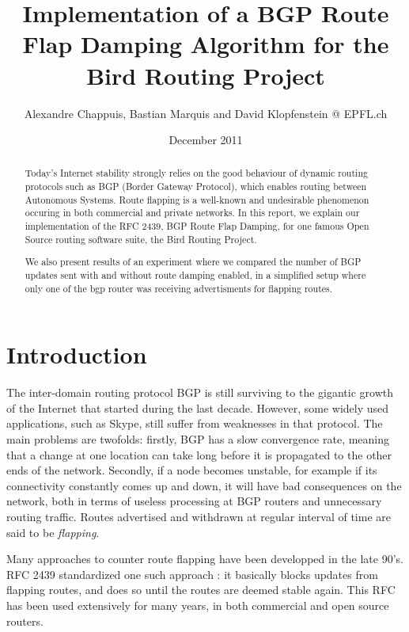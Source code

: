 \documentclass[a4paper,english]{IEEEtran}
\begin{document}
\date{December 2011}

\author{Alexandre Chappuis, Bastian Marquis and David Klopfenstein @ EPFL.ch}

\title{Implementation of a BGP Route Flap Damping Algorithm for the Bird
Routing Project}

\maketitle

\begin{abstract}
Today's Internet stability strongly relies on the good behaviour of
dynamic routing protocols such as BGP (Border Gateway Protocol), which
enables routing between Autonomous Systems. Route flapping is a well-known
and undesirable phenomenon occuring in both commercial and private
networks. In this report, we explain our implementation of the RFC
2439, BGP Route Flap Damping, for one famous Open Source routing software
suite, the Bird Routing Project.

We also present results of an experiment where we compared the number
of BGP updates sent with and without route damping enabled, in a simplified setup
where only one of the bgp router was receiving advertisments for flapping
routes.
\end{abstract}

\section{Introduction}

The inter-domain routing protocol BGP is still surviving to the gigantic
growth of the Internet that started during the last decade. However,
some widely used applications, such as Skype, still suffer from weaknesses
in that protocol. The main problems are twofolds: firstly, BGP has
a slow convergence rate, meaning that a change at one location can take
long before it is propagated to the other ends of the network.
Secondly, if a node becomes unstable, for example if its connectivity
constantly comes up and down, it will have bad consequences on the
network, both in terms of useless processing at BGP routers and unnecessary
routing traffic. Routes advertised and withdrawn at regular interval
of time are said to be \textit{flapping}.

Many approaches to counter route flapping have been developped in
the late 90's. RFC 2439\cite{rfc2439} standardized one such approach
: it basically blocks updates from flapping routes, and does so until
the routes are deemed stable again. This RFC has been used extensively
for many years, in both commercial and open source routers.
\end{document}
